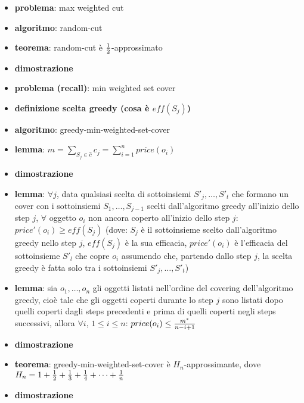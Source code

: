     \begin{itemize}

\item
  \textbf{problema}: max weighted cut
\item
  \textbf{algoritmo}: random-cut
\item
  \textbf{teorema}: random-cut è \({1 \over 2}\)-approssimato
\item
  \textbf{dimostrazione}
\item
  \textbf{problema (recall)}: min weighted set cover
\item
  \textbf{definizione scelta greedy (cosa è \(eff(S_j)\))}
\item
  \textbf{algoritmo}: greedy-min-weighted-set-cover
\item
  \textbf{lemma}:
  \(m = \sum_{S_j \in \hat{c}} c_j = \sum_{i=1}^{n} price(o_i)\)
\item
  \textbf{dimostrazione}
\item
  \textbf{lemma}: \(\forall j\), data qualsiasi scelta di sottoinsiemi
  \(S'_j,\dots,S'_t\) che formano un cover con i sottoinsiemi
  \(S_1,\dots,S_{j-1}\) scelti dall'algoritmo greedy all'inizio dello
  step \(j\), \(\forall\) oggetto \(o_i\) non ancora coperto all'inizio
  dello step \(j\): \(price'(o_i) \geq eff(S_j)\) (dove: \(S_j\) è il
  sottoinsieme scelto dall'algoritmo greedy nello step \(j\),
  \(eff(S_j)\) è la sua efficacia, \(price'(o_i)\) è l'efficacia del
  sottoinsieme \(S'_l\) che copre \(o_i\) assumendo che, partendo dallo
  step \(j\), la scelta greedy è fatta solo tra i sottoinsiemi
  \(S'_j,\dots,S'_t\))
\item
  \textbf{lemma}: sia \(o_1,\dots,o_n\) gli oggetti listati nell'ordine
  del covering dell'algoritmo greedy, cioè tale che gli oggetti coperti
  durante lo step \(j\) sono listati dopo quelli coperti dagli steps
  precedenti e prima di quelli coperti negli steps successivi, allora
  \(\forall i\), \(1 \leq i \leq n\):
  \(price(o_i) \leq {{m^*} \over {n - i + 1}}\)
\item
  \textbf{dimostrazione}
\item
  \textbf{teorema}: greedy-min-weighted-set-cover è
  \(H_n\)-approssimante, dove
  \(H_n = 1 + {1 \over 2} + {1 \over 3} + {1 \over 4} + \dots + {1 \over n}\)
\item
  \textbf{dimostrazione}
\end{itemize}

